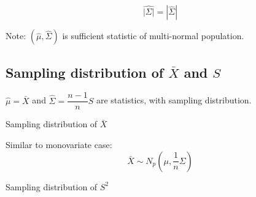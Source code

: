     \begin{equation}
        \widehat{|\Sigma |} =|\hat{\Sigma } | 
    \end{equation}
    
    
        Note: $ (\hat{\mu} , \hat{\Sigma} ) $ is sufficient statistic of multi-normal population.







    
        
\subsection{Sampling distribution of $ \bar{X} $ and $ S $}\label{SubSubSectionMultivariateNormalSamplingDistribution}
        $ \hat{\mu}=\bar{X} $ and $ \hat{\Sigma}=\dfrac{n-1}{n}S $ are statistics, with sampling distribution.



    \begin{point}
        Sampling distribution of $ \bar{X} $
    \end{point}

    Similar to monovariate case:
    \begin{equation}
        \bar{X}\sim N_p(\mu,\dfrac{1}{n}\Sigma ) 
    \end{equation}
    
    \begin{point}
        Sampling distribution of $ S^2 $
    \end{point}
    
